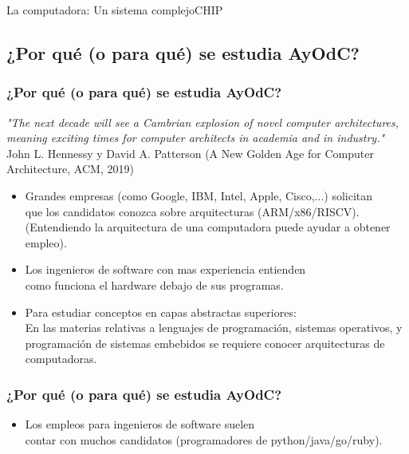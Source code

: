\documentclass[aspectratio=169,compress]{beamer}
\begin{document}
\begin{frame}{La computadora: Un sistema complejo}{CHIP}
\begin{frame}[fragile]
\end{frame}

\subsection{¿Por qué (o para qué) se estudia AyOdC?}

\begin{frame}[fragile]
  \frametitle{¿Por qué (o para qué) se estudia AyOdC?}
\begin{small}
\textit{"The next decade will see a Cambrian explosion of novel computer architectures, meaning exciting times for computer architects in academia and in industry."}
John L. Hennessy y David A. Patterson 
(A New Golden Age for Computer Architecture, ACM, 2019)
\end{small}

\bigskip
\begin{small}
\begin{itemize}
\item Grandes empresas (como Google, IBM, Intel, Apple, Cisco,...)
solicitan \\ que los candidatos conozca sobre arquitecturas (ARM/x86/RISCV).\\
(Entendiendo la arquitectura de una computadora puede ayudar a obtener empleo).

\item Los ingenieros de software con mas experiencia entienden \\ como funciona el hardware debajo de sus programas.

\item Para estudiar conceptos en capas abstractas superiores: \\
En las materias relativas a lenguajes de programación, sistemas operativos, y programación de sistemas embebidos se requiere conocer arquitecturas de computadoras.

\end{itemize}
\end{small}

\end{frame}




\begin{frame}[fragile]
  \frametitle{¿Por qué (o para qué) se estudia AyOdC?}

\begin{small}
\begin{itemize}
\item Los empleos para ingenieros de software suelen \\ contar 
con muchos candidatos (programadores de python/java/go/ruby).


\end{itemize}
\end{small}
\end{frame}
\end{frame}
\end{document}
